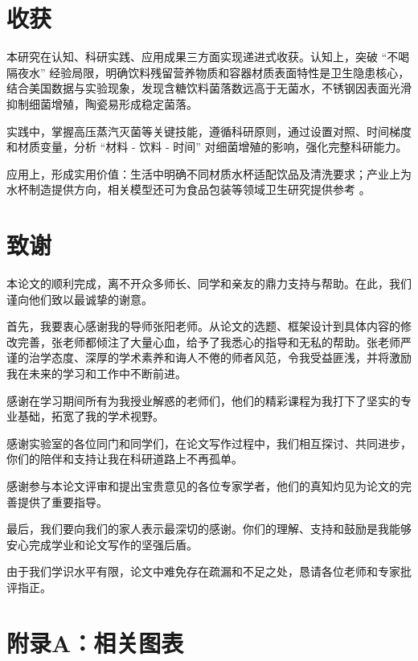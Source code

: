 \documentclass[12pt,a4paper]{ctexart}
\begin{document}
\section{收获}
本研究在认知、科研实践、应用成果三方面实现递进式收获。认知上，突破 “不喝隔夜水” 经验局限，明确饮料残留营养物质和容器材质表面特性是卫生隐患核心，结合美国数据与实验现象，发现含糖饮料菌落数远高于无菌水，不锈钢因表面光滑抑制细菌增殖，陶瓷易形成稳定菌落。

实践中，掌握高压蒸汽灭菌等关键技能，遵循科研原则，通过设置对照、时间梯度和材质变量，分析 “材料 - 饮料 - 时间” 对细菌增殖的影响，强化完整科研能力。

应用上，形成实用价值：生活中明确不同材质水杯适配饮品及清洗要求；产业上为水杯制造提供方向，相关模型还可为食品包装等领域卫生研究提供参考 。

\clearpage
\thispagestyle{empty} 
\section{致谢} %

本论文的顺利完成，离不开众多师长、同学和亲友的鼎力支持与帮助。在此，我们谨向他们致以最诚挚的谢意。

首先，我要衷心感谢我的导师张阳老师。从论文的选题、框架设计到具体内容的修改完善，张老师都倾注了大量心血，给予了我悉心的指导和无私的帮助。张老师严谨的治学态度、深厚的学术素养和诲人不倦的师者风范，令我受益匪浅，并将激励我在未来的学习和工作中不断前进。

感谢在学习期间所有为我授业解惑的老师们，他们的精彩课程为我打下了坚实的专业基础，拓宽了我的学术视野。

感谢实验室的各位同门和同学们，在论文写作过程中，我们相互探讨、共同进步，你们的陪伴和支持让我在科研道路上不再孤单。

感谢参与本论文评审和提出宝贵意见的各位专家学者，他们的真知灼见为论文的完善提供了重要指导。

最后，我们要向我们的家人表示最深切的感谢。你们的理解、支持和鼓励是我能够安心完成学业和论文写作的坚强后盾。

由于我们学识水平有限，论文中难免存在疏漏和不足之处，恳请各位老师和专家批评指正。\newpage

\clearpage
\thispagestyle{empty} 
\section{附录A：相关图表}
\end{document}
